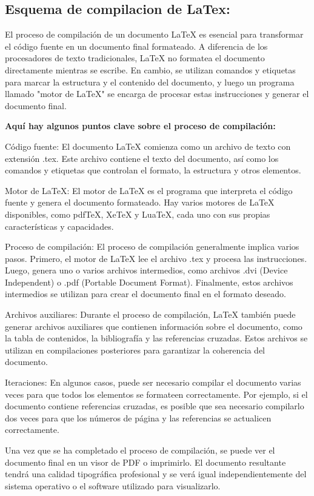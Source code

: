 \documentclass[10pt]{article}
\begin{document}
    \subsection{Esquema de compilacion de LaTex:}
    El proceso de compilación de un documento LaTeX es esencial para transformar el código fuente en un documento final formateado. 
    A diferencia de los procesadores de texto tradicionales, LaTeX no formatea el documento directamente mientras se escribe. 
    En cambio, se utilizan comandos y etiquetas para marcar la estructura y el contenido del documento, y luego un programa llamado "motor de LaTeX" se encarga de procesar estas instrucciones y generar el documento final.
    
    \textbf{Aquí hay algunos puntos clave sobre el proceso de compilación:}

    Código fuente: El documento LaTeX comienza como un archivo de texto con extensión .tex. Este archivo contiene el texto del documento, así como los comandos y etiquetas que controlan el formato, la estructura y otros elementos.

    Motor de LaTeX: El motor de LaTeX es el programa que interpreta el código fuente y genera el documento formateado. Hay varios motores de LaTeX disponibles, como pdfTeX, XeTeX y LuaTeX, cada uno con sus propias características y capacidades.

    Proceso de compilación: El proceso de compilación generalmente implica varios pasos. Primero, el motor de LaTeX lee el archivo .tex y procesa las instrucciones. Luego, genera uno o varios archivos intermedios, como archivos .dvi (Device Independent) o .pdf (Portable Document Format). Finalmente, estos archivos intermedios se utilizan para crear el documento final en el formato deseado.

    Archivos auxiliares: Durante el proceso de compilación, LaTeX también puede generar archivos auxiliares que contienen información sobre el documento, como la tabla de contenidos, la bibliografía y las referencias cruzadas. Estos archivos se utilizan en compilaciones posteriores para garantizar la coherencia del documento.

    Iteraciones: En algunos casos, puede ser necesario compilar el documento varias veces para que todos los elementos se formateen correctamente. Por ejemplo, si el documento contiene referencias cruzadas, es posible que sea necesario compilarlo dos veces para que los números de página y las referencias se actualicen correctamente.

    Una vez que se ha completado el proceso de compilación, se puede ver el documento final en un visor de PDF o imprimirlo. El documento resultante tendrá una calidad tipográfica profesional y se verá igual independientemente del sistema operativo o el software utilizado para visualizarlo.
\end{document}
